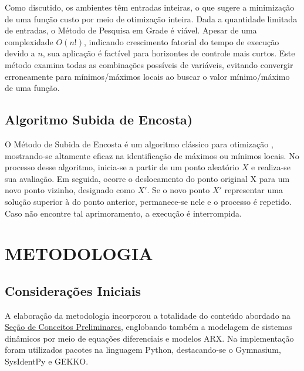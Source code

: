 \documentclass[12pt,           %
a4paper,                       %
openany,                       %
oneside,                       %
chapter=TITLE,                 %
english,                       %
spanish,                       %
brazil,                        %
sumario=tradicional]{abntex2}  %
\begin{document}
\begin{OnehalfSpace}
Como discutido, os ambientes têm entradas inteiras, o que sugere a minimização de uma função custo por meio de otimização inteira. Dada a quantidade limitada de entradas, o Método de Pesquisa em Grade é viável. Apesar de uma complexidade \(O(n!)\), indicando crescimento fatorial do tempo de execução devido a $n$, sua aplicação é factível para horizontes de controle mais curtos. Este método examina todas as combinações possíveis de variáveis, evitando convergir erroneamente para mínimos/máximos locais ao buscar o valor mínimo/máximo de uma função.

\section{ Algoritmo Subida de Encosta)}
\label{sec:Hill}

O Método de Subida de Encosta é um algoritmo clássico para otimização \cite{hill}, mostrando-se altamente eficaz na identificação de máximos ou mínimos locais. No processo desse algoritmo, inicia-se a partir de um ponto aleatório $X$ e realiza-se sua avaliação. Em seguida, ocorre o deslocamento do ponto original X para um novo ponto vizinho, designado como $X'$. Se o novo ponto $X'$ representar uma solução superior à do ponto anterior, permanece-se nele e o processo é repetido. Caso não encontre tal aprimoramento, a execução é interrompida.\\
			 
		
{\let\clearpage\relax\par \chapter{METODOLOGIA}}
\label{ch:metodologia}                      %

\section{Considerações Iniciais}
\label{sec:considIniciaisMetodologia}               %

A elaboração da metodologia incorporou a totalidade do conteúdo abordado na \hyperref[ch:conceitosPreliminares]{Seção de Conceitos Preliminares}, englobando também a modelagem de sistemas dinâmicos por meio de equações diferenciais e modelos ARX. Na implementação foram utilizados pacotes na linguagem Python, destacando-se o Gymnasium, SysIdentPy e GEKKO.



\end{OnehalfSpace}
\end{document}

